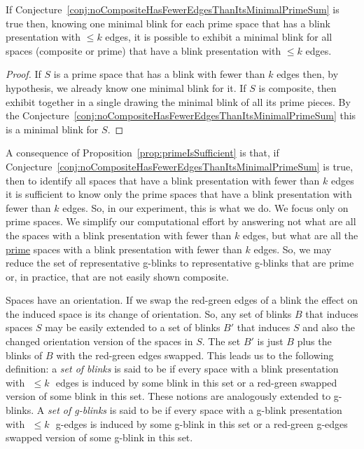 \begin{Prop} \label{prop:primeIsSufficient}
If Conjecture~\ref{conj:noCompositeHasFewerEdgesThanItsMinimalPrimeSum} is true
then, knowing one minimal blink for each prime space that has a blink presentation
with $\leq k$ edges, it is possible to exhibit a minimal blink
for all spaces (composite or prime) that have a blink presentation with
$\leq k$ edges.
\end{Prop}
\begin{proof}
If $S$ is a prime space that has a blink with fewer than $k$ edges then,
by hypothesis, we already know one minimal blink for it. If $S$ is composite,
then exhibit together in a single drawing the minimal blink of all its prime
pieces. By the Conjecture~\ref{conj:noCompositeHasFewerEdgesThanItsMinimalPrimeSum}
this is a minimal blink for $S$.
\end{proof}

A consequence of Proposition~\ref{prop:primeIsSufficient} is that, if
Conjecture~\ref{conj:noCompositeHasFewerEdgesThanItsMinimalPrimeSum} is true, then
to identify all spaces that have a blink presentation with fewer than $k$ edges
it is sufficient to know only the prime spaces that have a blink
presentation with fewer than $k$ edges. So, in our experiment,
this is what we do. We focus only on prime spaces. We simplify our
computational effort by answering not what are all the spaces with
a blink presentation with fewer than $k$ edges, but what are all the
\underline{prime} spaces with a blink presentation with fewer than $k$
edges. So, we may reduce the set of representative g-blinks to
representative g-blinks that are prime or, in practice, that are
not easily shown composite.

Spaces have an orientation. If we swap the red-green edges of a
blink the effect on the induced space is its change of orientation.
So, any set of blinks $B$ that induces spaces $S$ may be easily
extended to a set of blinks $B'$ that induces $S$ and also the
changed orientation version of the spaces in $S$. The set $B'$ is
just $B$ plus the blinks of $B$ with the red-green edges swapped.
This leads us to the following definition: a {\it set of blinks} is
said to be {\it \kpu} if every space with a blink presentation with
$\,\,\leq k \,\,$ edges is induced by some blink in this set or a
red-green swapped version of some blink in this set. These notions
are analogously extended to g-blinks. A {\it set of g-blinks} is
said to be {\it \kpu} if every space with a g-blink presentation with
$\,\,\leq k \,\,$ g-edges is induced by some g-blink in this set or
a red-green g-edges swapped version of some g-blink in this set.

